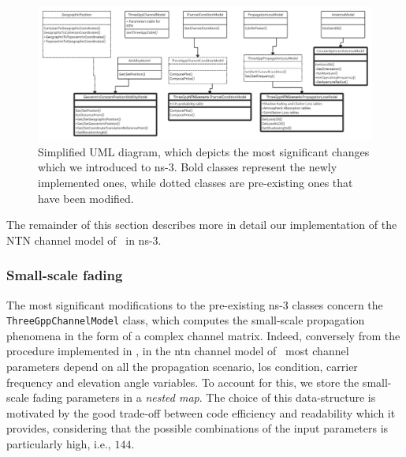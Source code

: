 \begin{figure}[t]
    \includegraphics[width=\textwidth]{Figures/ChannelNtn/uml-diagram.png}
    \caption{Simplified UML diagram, which depicts the most significant changes which we introduced to ns-3. Bold classes represent the newly implemented ones, while dotted classes are pre-existing ones that have been modified.}
    \label{fig:ntn-uml}
\end{figure}

The remainder of this section describes more in detail our implementation of the NTN channel model of~\cite{38811} in ns-3. 

\subsubsection{Small-scale fading}
The most significant modifications to the pre-existing ns-3 classes concern the \texttt{Three\-Gpp\-Channel\-Model} class, which computes the small-scale propagation phenomena in the form of a complex channel matrix. Indeed, conversely from the procedure implemented in \cite{zugno20implementation}, in the \gls{ntn} channel model of~\cite{38811} most channel parameters depend on all the propagation scenario, \gls{los} condition, carrier frequency and elevation angle variables.  
To account for this, we store the small-scale fading parameters in a \emph{nested map}. The choice of this data-structure is motivated by the good trade-off between code efficiency and readability which it provides, considering that the possible combinations of the input parameters is particularly high, i.e., $144$.

